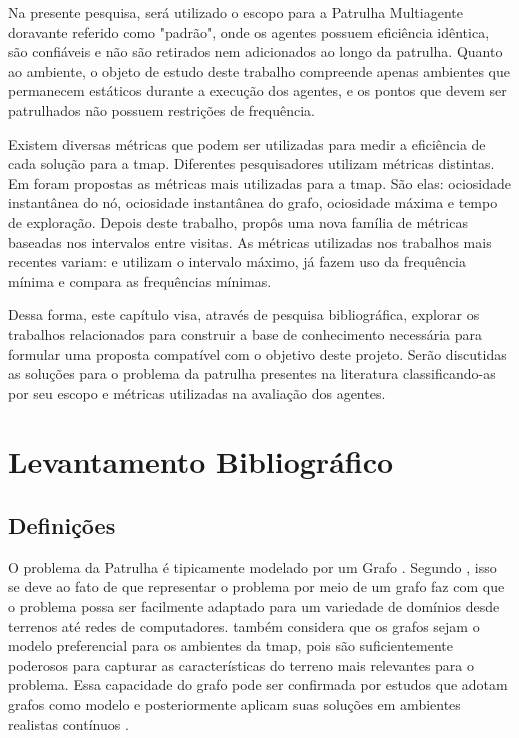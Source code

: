 Na presente pesquisa, será utilizado o escopo para a Patrulha Multiagente 
doravante referido como "padrão", onde os agentes possuem eficiência idêntica, 
são confiáveis e não são retirados nem adicionados ao longo da patrulha. Quanto 
ao ambiente, o objeto de estudo deste trabalho compreende apenas ambientes que 
permanecem estáticos durante a execução dos agentes, e os pontos que devem ser 
patrulhados não possuem restrições de frequência.

Existem diversas métricas que podem ser utilizadas para medir a eficiência de 
cada solução para a \ac{tmap}. Diferentes pesquisadores utilizam métricas 
distintas. Em \citep{Machado:2002:MPE:1765317.1765332} foram propostas as 
métricas mais utilizadas para a \ac{tmap}. São elas: ociosidade instantânea do 
nó, ociosidade instantânea do grafo, ociosidade máxima e tempo de exploração. 
Depois deste trabalho, \citep{sampaiophd} propôs uma nova família de métricas 
baseadas nos intervalos entre visitas. As métricas utilizadas nos trabalhos mais 
recentes variam: \citep{6900280} e \citep{Pippin:2013:PBT:2480362.2480378} 
utilizam o intervalo máximo, já \citep{4209122} fazem uso da frequência mínima e 
\citep{hernandez2013game} compara as frequências mínimas.

Dessa forma, este capítulo visa, através de pesquisa bibliográfica, explorar os 
trabalhos relacionados para construir a base de conhecimento necessária para 
formular uma proposta compatível com o objetivo deste projeto. Serão discutidas 
as soluções para o problema da patrulha presentes na literatura 
classificando-as por seu escopo e métricas utilizadas na avaliação dos agentes.

\section{Levantamento Bibliográfico}

\subsection{Definições}
\label{definicoes_tmap}

O problema da Patrulha é tipicamente modelado por um Grafo 
\citep{Rosen:2002:DMA:579402}. Segundo \citep{Almeida:2004:AAI}, isso se deve 
ao fato de que representar o problema por meio de um grafo faz com que o 
problema possa ser facilmente adaptado para um variedade de domínios desde 
terrenos até redes de computadores. \citep{sampaiophd} também considera que os 
grafos sejam o modelo preferencial para os ambientes da \ac{tmap}, pois são 
suficientemente poderosos para capturar as características do terreno mais 
relevantes para o problema. Essa capacidade do grafo pode ser confirmada por 
estudos que adotam grafos como modelo e posteriormente aplicam suas soluções em 
ambientes realistas contínuos \citep{Pippin:2013:PBT:2480362.2480378}.

